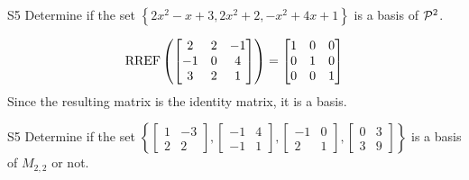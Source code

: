 \begin{problem}{S5}
  Determine if the set $\left\{ 2x^2-x+3, 2x^2+2, -x^2+4x+1 \right\}$
  is a basis of $\P^2$.
\end{problem}
\begin{solution}
  \[\RREF\left(
    \begin{bmatrix}
      2 & 2 & -1 \\
      -1 & 0 & 4 \\
      3 & 2 & 1
    \end{bmatrix} \right)= \begin{bmatrix}
      1 & 0 &0 \\
      0 & 1 & 0 \\
      0 & 0 & 1
    \end{bmatrix}
  \]
Since the resulting matrix is the identity matrix, it is a basis.
\end{solution}
\begin{problem}{S5}
Determine if the set $\left\{
\begin{bmatrix} 1 & -3 \\ 2 & 2 \end{bmatrix},
\begin{bmatrix} -1 & 4 \\ -1 & 1 \end{bmatrix},
\begin{bmatrix} -1 & 0 \\ 2 & 1 \end{bmatrix},
\begin{bmatrix} 0 & 3 \\ 3 & 9 \end{bmatrix}
\right\}$ is a basis of \(M_{2,2}\) or not.
\end{problem}


